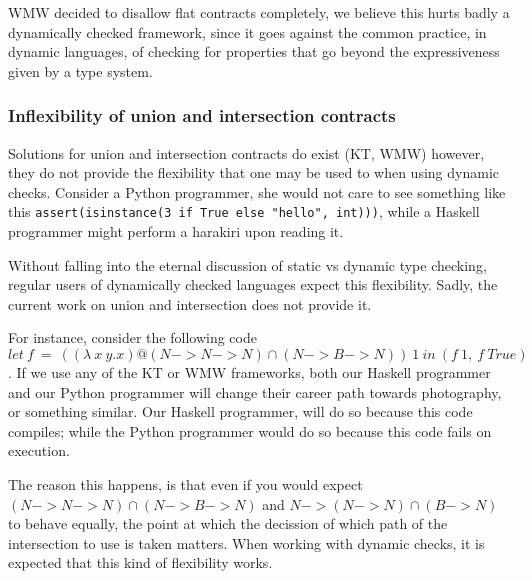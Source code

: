 WMW decided to disallow flat contracts completely,
we believe this hurts badly a dynamically checked framework, since it goes against
the common practice, in dynamic languages, of checking for properties
that go beyond the expressiveness given by a type system.

\subsubsection*{Inflexibility of union and intersection contracts}

Solutions for union and intersection contracts do exist (KT, WMW) however,
they do not provide the flexibility that one may be used to when using dynamic checks.
Consider a Python programmer, she would not care to see something like this
\texttt{assert(isinstance(3 if True else "hello", int)))}, while a Haskell programmer
might perform a harakiri upon reading it.

Without falling into the eternal discussion of static vs dynamic type checking,
regular users of dynamically checked languages expect this flexibility.
Sadly, the current work on union and intersection does not provide it.

For instance, consider the following code
$let~f~=~((\lambda~x~y.x)@(N -> N -> N) \cap (N -> B -> N))~1~in~(f~1,~f~True)$.
If we use any of the KT or WMW frameworks, both our Haskell programmer and our
Python programmer will change their career path towards photography, or something
similar.
Our Haskell programmer, will do so because this code compiles;
while the Python programmer would do so because this code fails on execution.

The reason this happens, is that even if you would expect
$(N -> N -> N) \cap (N -> B -> N)$
and $N -> (N -> N) \cap (B -> N)$ to behave equally, the point at which
the decission of which path of the intersection to use is taken
matters.
When working with dynamic checks, it is expected that this kind of
flexibility works.


